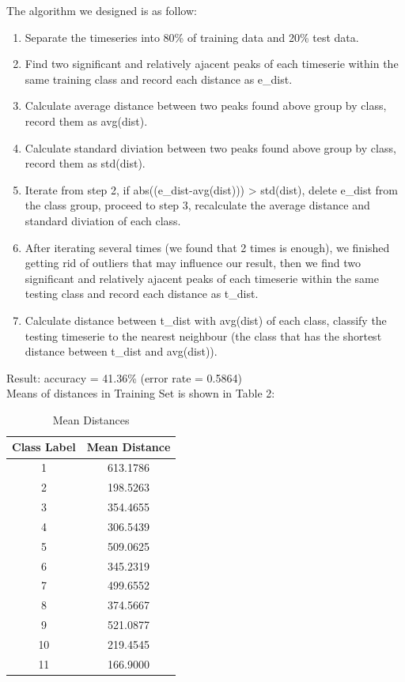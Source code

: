 \begin{enumerate}
The algorithm we designed is as follow:\\
\begin{enumerate}
\item Separate the timeseries into 80\% of training data and 20\% test data. \\ 
\item Find two significant and relatively ajacent peaks of each timeserie within the same training class and record each distance as e\_dist.\\
\item Calculate average distance between two peaks found above group by class, record them as avg(dist).\\
\item  Calculate standard diviation between two peaks found above group by class, record them as std(dist).\\
\item  Iterate from step 2, if abs((e\_dist-avg(dist))) > std(dist), delete e\_dist from the class group, proceed to step 3, recalculate the average distance and standard diviation of each class.\\
\item  After iterating several times (we found that 2 times is enough), we finished getting rid of outliers that may influence our result, then we find two significant and relatively ajacent peaks of each timeserie within the same testing class and record each distance as t\_dist.\\
\item  Calculate distance between t\_dist with avg(dist) of each class, classify the testing timeserie to the nearest neighbour (the class that has the shortest distance between t\_dist and avg(dist)).\\
\end{enumerate}
Result: accuracy = 41.36\% (error rate = 0.5864)\\

Means of distances in Training Set is shown in Table 2:\\
\begin{table}[H]
\caption{Mean Distances}
\centering 
\begin{tabular}{c c}
\hline\hline 
Class Label & Mean Distance\\[0.5ex] 
\hline
    1 & 613.1786 \\
    2 & 198.5263 \\
    3 & 354.4655 \\
    4 & 306.5439 \\
    5 & 509.0625 \\
    6 & 345.2319 \\
    7 & 499.6552 \\
    8 & 374.5667 \\
    9 & 521.0877 \\
   10 & 219.4545 \\
   11 & 166.9000 \\ [1ex]
 

\end{tabular}
\end{table}
\end{enumerate}
